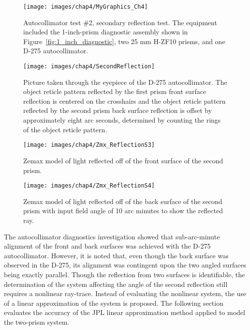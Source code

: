 \begin{figure}[htb]  %
\centering
\texttt{[image: images/chap4/MyGraphics\_Ch4]}
\caption{Autocollimator test \#2, secondary reflection test. The equipment included the 1-inch-prism diagnostic assembly shown in Figure~\ref{fig:1_inch_diagnostic}, two 25 mm H-ZF10 prisms, and one D-275 autocollimator.}
\label{fig:AutoC_Test_2}
\end{figure}

\begin{figure}[htb]		%
\centering
\texttt{[image: images/chap4/SecondReflection]}
\caption{Picture taken through the eyepiece of the D-275 autocollimator. The object reticle pattern reflected by the first prism front surface reflection is centered on the crosshairs and the object reticle pattern reflected by the second prism back surface reflection is offset by approximately eight arc seconds, determined by counting the rings of the object reticle pattern.}
\label{fig:secondReflection}
\end{figure}

\begin{figure}[htb]		%
\centering
\texttt{[image: images/chap4/Zmx\_ReflectionS3]}
\caption{Zemax model of light reflected off of the front surface of the second prism.}
\label{fig:Zmx_ReflectionS3}
\end{figure}

\begin{figure}[htb]		%
\centering
\texttt{[image: images/chap4/Zmx\_ReflectionS4]}
\caption{Zemax model of light reflected off of the back surface of the second prism with input field angle of 10 arc minutes to show the reflected ray.}
\label{fig:Zmx_ReflectionS4}
\end{figure}

The autocollimator diagnostics investigation showed that sub-arc-minute alignment of the front and back surfaces was achieved with the D-275 autocollimator. However, it is noted that, even though the back surface was observed in the D-275, its alignment was contingent upon the two angled surfaces being exactly parallel. Though the reflection from two surfaces is identifiable, the determination of the system affecting the angle of the second reflection still requires a nonlinear ray-trace. Instead of evaluating the nonlinear system, the use of a linear approximation of the system is proposed. The following section evaluates the accuracy of the JPL linear approximation method applied to model the two-prism system.

